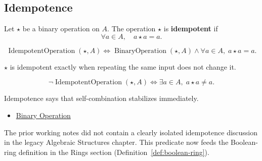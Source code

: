 \subsection*{Idempotence}
\label{subsec:idempotence}

\begin{definition}
\label{def:idempotent-operation}
Let $\star$ be a binary operation on $A$.
The operation $\star$ is \textbf{idempotent} if
\[
\forall a \in A,\quad a \star a = a.
\]
\end{definition}

\begin{remark*}
\[
\operatorname{IdempotentOperation}(\star,A)
\Longleftrightarrow
\operatorname{BinaryOperation}(\star,A)
\land
\forall a\in A,\; a\star a=a.
\]
\end{remark*}

\begin{remark*}
$\star$ is idempotent exactly when repeating the same input does not change it.
\end{remark*}

\begin{remark*}
\[
\neg\operatorname{IdempotentOperation}(\star,A)
\Longleftrightarrow
\exists a\in A,\; a\star a\neq a.
\]
\end{remark*}

\begin{remark*}[Interpretation]
Idempotence says that self-combination stabilizes immediately.
\end{remark*}

\begin{dependencies}
\begin{itemize}
  \item \hyperref[def:binary-operation]{Binary Operation}
\end{itemize}
\end{dependencies}

\begin{remark*}
The prior working notes did not contain a clearly isolated idempotence
discussion in the legacy Algebraic Structures chapter. This predicate now
feeds the Boolean-ring definition in the Rings section
(Definition~\ref{def:boolean-ring}).
\end{remark*}

